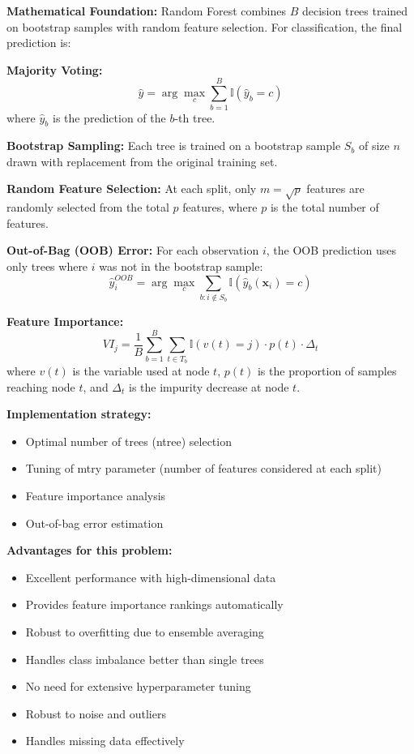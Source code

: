 \textbf{Mathematical Foundation:}
Random Forest combines $B$ decision trees trained on bootstrap samples with random feature selection. For classification, the final prediction is:

\textbf{Majority Voting:}
\begin{equation}
\hat{y} = \arg\max_{c} \sum_{b=1}^{B} \mathbb{I}(\hat{y}_b = c)
\end{equation}
where $\hat{y}_b$ is the prediction of the $b$-th tree.

\textbf{Bootstrap Sampling:}
Each tree is trained on a bootstrap sample $S_b$ of size $n$ drawn with replacement from the original training set.

\textbf{Random Feature Selection:}
At each split, only $m = \sqrt{p}$ features are randomly selected from the total $p$ features, where $p$ is the total number of features.

\textbf{Out-of-Bag (OOB) Error:}
For each observation $i$, the OOB prediction uses only trees where $i$ was not in the bootstrap sample:
\begin{equation}
\hat{y}_i^{OOB} = \arg\max_{c} \sum_{b: i \notin S_b} \mathbb{I}(\hat{y}_b(\mathbf{x}_i) = c)
\end{equation}

\textbf{Feature Importance:}
\begin{equation}
VI_j = \frac{1}{B} \sum_{b=1}^{B} \sum_{t \in T_b} \mathbb{I}(v(t) = j) \cdot p(t) \cdot \Delta_t
\end{equation}
where $v(t)$ is the variable used at node $t$, $p(t)$ is the proportion of samples reaching node $t$, and $\Delta_t$ is the impurity decrease at node $t$.

\textbf{Implementation strategy:}
\begin{itemize}
    \item Optimal number of trees (ntree) selection
    \item Tuning of mtry parameter (number of features considered at each split)
    \item Feature importance analysis
    \item Out-of-bag error estimation
\end{itemize}

\textbf{Advantages for this problem:}
\begin{itemize}
    \item Excellent performance with high-dimensional data \cite{geeksforgeeks2025random}
    \item Provides feature importance rankings automatically
    \item Robust to overfitting due to ensemble averaging
    \item Handles class imbalance better than single trees
    \item No need for extensive hyperparameter tuning
    \item Robust to noise and outliers \cite{geeksforgeeks2025advantages}
    \item Handles missing data effectively
\end{itemize}

